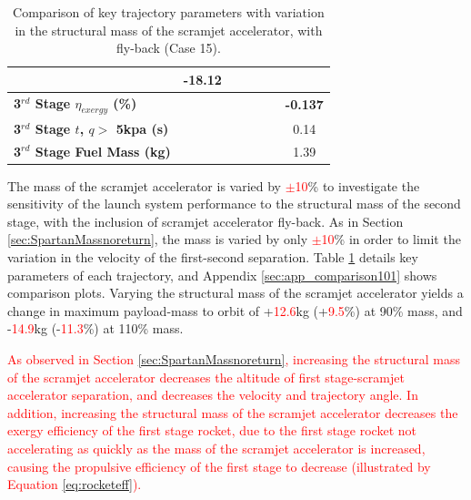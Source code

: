 \begin{table}[ht]
\begin{tabular}{l c c c c c c}
	&-18.12
	\\
	\hline 
	\textbf{3$^{rd}$ Stage $\eta_{exergy}$ (\%)}
	& \textbf{\thirddExergyEffmSPARTANNinety}
	& \textbf{\thirddExergyEffmSPARTANNinetyFive}
	& \textbf{\thirddExergyEffmSPARTANStandard}
	& \textbf{\thirddExergyEffmSPARTANOneHundredFive}
	& \textbf{\thirddExergyEffmSPARTANOneHundredTen}
	& \textbf{-0.137}
	\\
	\textbf{3$^{rd}$ Stage $t$, $q >$ 5kpa (s)}
	& \thirdqOverFivemSPARTANNinety
	& \thirdqOverFivemSPARTANNinetyFive
	& \thirdqOverFivemSPARTANStandard
	& \thirdqOverFivemSPARTANOneHundredFive
	& \thirdqOverFivemSPARTANOneHundredTen
	&0.14
	\\
	\textbf{3$^{rd}$ Stage Fuel Mass (kg)}
	& \thirdmFuelmSPARTANNinety
	& \thirdmFuelmSPARTANNinetyFive
	& \thirdmFuelmSPARTANStandard
	& \thirdmFuelmSPARTANOneHundredFive
	& \thirdmFuelmSPARTANOneHundredTen
	&1.39
	\\
	\hline 
\end{tabular} 
\caption{Comparison of key trajectory parameters with variation in the structural mass of the scramjet accelerator, with fly-back (Case 15).}
\label{tab:comparison101}
\end{table}


The mass of the scramjet accelerator is varied by \textcolor{red}{$\pm$10}\% to investigate the sensitivity of the launch system performance to the structural mass of the second stage, with the inclusion of scramjet accelerator fly-back. As in Section \ref{sec:SpartanMassnoreturn}, the mass is varied by only \textcolor{red}{$\pm$10}\% in order to limit the variation in the velocity of the first-second separation.
Table \ref{tab:comparison101} details key parameters of each trajectory, and Appendix \ref{sec:app_comparison101} shows comparison plots.
Varying the structural mass of the scramjet accelerator yields a change in maximum payload-mass to orbit of +\textcolor{red}{12.6}kg (+\textcolor{red}{9.5}\%) at 90\% mass, and -\textcolor{red}{14.9}kg (-\textcolor{red}{11.3}\%) at 110\% mass. 


\textcolor{red}{
As observed in Section \ref{sec:SpartanMassnoreturn}, increasing the structural mass of the scramjet accelerator decreases the altitude of first stage-scramjet accelerator separation, and decreases the velocity and trajectory angle. 
In addition, increasing the structural mass of the scramjet accelerator decreases the exergy efficiency of the first stage rocket, due to the first stage rocket not accelerating as quickly as the mass of the scramjet accelerator is increased, causing the propulsive efficiency of the first stage to decrease (illustrated by Equation \ref{eq:rocketeff}).}

